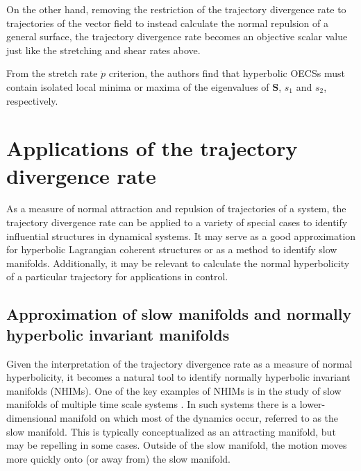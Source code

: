 \documentclass[twocolumn]{svjour3}
\begin{document}
On the other hand, removing the restriction of the trajectory divergence rate to trajectories of the vector field to instead calculate the normal repulsion of a general surface, the trajectory divergence rate becomes an objective scalar value just like the stretching and shear rates above.

From the stretch rate $\dot{p}$ criterion, the authors find that hyperbolic OECSs must contain isolated local minima or maxima of the eigenvalues of $\mathbf{S}$, $s_1$ and $s_2$, respectively.

\section{Applications of the trajectory divergence rate}\label{s:Application}
As a measure of normal attraction and repulsion of trajectories of a system, the trajectory divergence rate can be applied to a variety of special cases to identify influential structures in dynamical systems. It may serve as a good approximation for hyperbolic Lagrangian coherent structures or as a method to identify slow manifolds. Additionally, it may be relevant to calculate the normal hyperbolicity of a particular trajectory for applications in control.


\subsection{Approximation of slow manifolds and normally hyperbolic invariant manifolds}
Given the interpretation of the trajectory divergence rate as a measure of normal hyperbolicity, it becomes a natural tool to identify normally hyperbolic invariant manifolds (NHIMs). One of the key examples of NHIMs is in the study of slow manifolds of multiple time scale systems \cite{kuehn2016multiple}. In such systems there is a lower-dimensional manifold on which most of the dynamics occur, referred to as the slow manifold. This is typically conceptualized as an attracting manifold, but may be repelling in some cases. Outside of the slow manifold, the motion moves more quickly onto (or away from) the slow manifold. %
\end{document}
